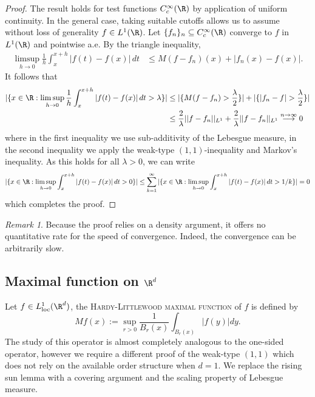 \documentclass[reqno]{amsart}
\theoremstyle{definition}
\theoremstyle{remark}
\newtheorem*{remark}{Remark}
\renewcommand{\emph}{\textsc}
\begin{document}
\begin{proof}
	The result holds for test functions $C^\infty_c (\R)$ by application of uniform continuity. In the general case, taking suitable cutoffs allows us to assume without loss of generality $f \in L^1 (\R)$. Let $\{ f_n \}_n \subseteq C^\infty_c (\R)$ converge to $f$ in $L^1 (\R)$ and pointwise a.e. By the triangle inequality, 
		\begin{align*}
			 \limsup_{h \to 0}\frac1h \int_x^{x + h} |f(t) - f(x)| \, dt 
			 	&\leq M(f - f_n)(x) + |f_n (x) - f(x)|.
		\end{align*}	 
	It follows that
		\begin{align*}
			 |\{ x \in \R : \limsup_{h \to 0} \frac1h \int_x^{x + h} |f(t) - f(x)| \, dt > \lambda \}| 
			 	&\leq |\{ M(f - f_n) > \frac\lambda2 \}| + |\{  |f_n  - f| > \frac\lambda2 \}|\\
			 	&\leq \frac2\lambda ||f - f_n||_{L^1} + \frac2\lambda ||f - f_n||_{L^1} \overset{n \to \infty}{\longrightarrow} 0
		\end{align*}	 
	where in the first inequality we use sub-additivity of the Lebesgue measure, in the second inequality we apply the weak-type $(1, 1)$-inequality and Markov's inequality. As this holds for all $\lambda > 0$, we can write
		\[ |\{ x \in \R : \limsup_{h \to 0} \int_x^{x + h} |f(t) - f(x)| \, dt > 0 \}| \leq \sum_{k = 1}^\infty |\{ x \in \R : \limsup_{h \to 0} \int_x^{x + h} |f(t) - f(x)| \, dt > 1/k \}| = 0 \]
	which completes the proof. 		
\end{proof}

\begin{remark}
	Because the proof relies on a density argument, it offers no quantitative rate for the speed of convergence. Indeed, the convergence can be arbitrarily slow.
\end{remark}

\subsection{Maximal function on $\R^d$}

Let $f \in L^1_{\text{loc}} (\R^d)$, the \emph{Hardy-Littlewood maximal function} of $f$ is defined by
	\[ Mf (x) := \sup_{r > 0} \frac{1}{B_r (x)} \int_{B_r (x)} |f(y)| dy. \]
The study of this operator is almost completely analogous to the one-sided operator, however we require a different proof of the weak-type $(1, 1)$ which does not rely on the available order structure when $d = 1$. We replace the rising sun lemma with a covering argument and the scaling property of Lebesgue measure. 
\end{document}
